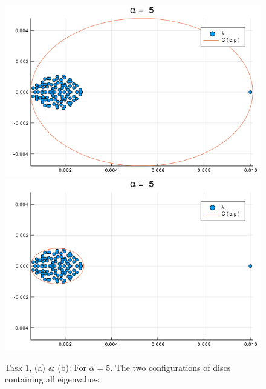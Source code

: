 \begin{figure}[h!]
\centering
\includegraphics[scale=0.4]{../task2/images/Task2_b_a5_1.png}
\includegraphics[scale=0.4]{../task2/images/Task2_b_a5_2.png}
\caption{Task $1$, (a) \& (b): For $\alpha = 5$. The two configurations of discs containing all eigenvalues.}
\label{fig:task2b_5}
\end{figure}

